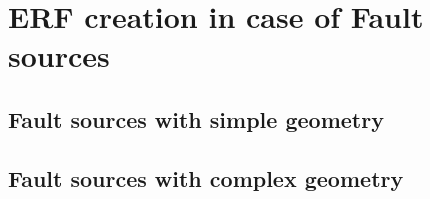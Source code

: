 %
\section{ERF creation in case of Fault sources}

%
\subsection{Fault sources with simple geometry}

%
\subsection{Fault sources with complex geometry}
